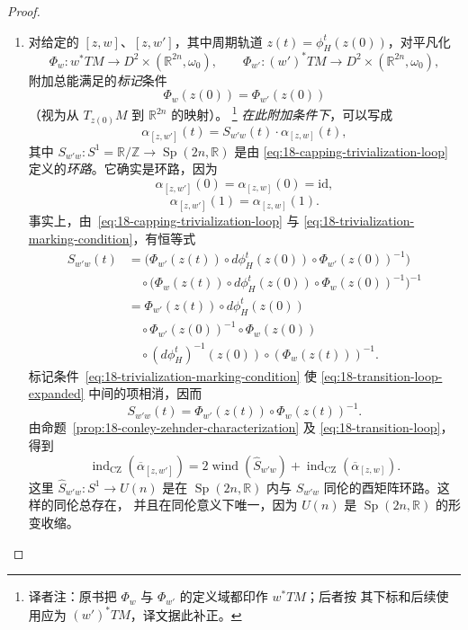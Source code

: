 \begin{proof}
\begin{enumerate}[label=\arabic*.]
\item {} 对给定的 $[z,w]$、$[z,w']$，其中周期轨道
$z(t)=\phi_H^t(z(0))$，对平凡化
\[
 \Phi_w:w^*TM\to D^2\times(\mathbb R^{2n},\omega_0),\qquad
 \Phi_{w'}:(w')^*TM\to D^2\times(\mathbb R^{2n},\omega_0),
\]
附加总能满足的\emph{标记}条件
\begin{equation}
 \Phi_w(z(0))=\Phi_{w'}(z(0))
 \label{eq:18-trivialization-marking-condition}
\end{equation}
（视为从 $T_{z(0)}M$ 到 $\mathbb R^{2n}$ 的映射）。
\footnote{译者注：原书把 $\Phi_w$ 与 $\Phi_{w'}$ 的定义域都印作 $w^*TM$；后者按
其下标和后续使用应为 $(w')^*TM$，译文据此补正。}
\emph{在此附加条件下}，可以写成
\begin{equation}
 \alpha_{[z,w']}(t)=S_{w'w}(t)\cdot\alpha_{[z,w]}(t),
 \label{eq:18-capping-trivialization-loop}
\end{equation}
其中 $S_{w'w}:S^1=\mathbb R/\mathbb Z\to\operatorname{Sp}(2n,\mathbb R)$ 是由
\eqref{eq:18-capping-trivialization-loop} 定义的\emph{环路}。它确实是环路，因为
\begin{equation}
 \alpha_{[z,w']}(0)=\alpha_{[z,w]}(0)=\mathrm{id},
 \label{eq:18-capping-path-start}
\end{equation}
\begin{equation}
 \alpha_{[z,w']}(1)=\alpha_{[z,w]}(1).
 \label{eq:18-capping-path-end}
\end{equation}
事实上，由~\eqref{eq:18-capping-trivialization-loop} 与
\eqref{eq:18-trivialization-marking-condition}，有恒等式
\begin{align}
 S_{w'w}(t)
 &=\bigl(\Phi_{w'}(z(t))\circ d\phi_H^t(z(0))
          \circ\Phi_{w'}(z(0))^{-1}\bigr)\nonumber\\
 &\quad\circ\bigl(\Phi_w(z(t))\circ d\phi_H^t(z(0))
          \circ\Phi_w(z(0))^{-1}\bigr)^{-1}\nonumber\\
 &=\Phi_{w'}(z(t))\circ d\phi_H^t(z(0))\nonumber\\
 &\quad\circ\Phi_{w'}(z(0))^{-1}\circ\Phi_w(z(0))\nonumber\\
 &\quad\circ(d\phi_H^t)^{-1}(z(0))\circ(\Phi_w(z(t)))^{-1}.
 \label{eq:18-transition-loop-expanded}
\end{align}
标记条件~\eqref{eq:18-trivialization-marking-condition} 使
\eqref{eq:18-transition-loop-expanded} 中间的项相消，因而
\begin{equation}
 S_{w'w}(t)=\Phi_{w'}(z(t))\circ\Phi_w(z(t))^{-1}.
 \label{eq:18-transition-loop}
\end{equation}
由命题~\ref{prop:18-conley-zehnder-characterization} 及
\eqref{eq:18-transition-loop}，得到
\begin{equation}
 \operatorname{ind}_{\mathrm{CZ}}(\overline\alpha_{[z,w']})
 =2\operatorname{wind}(\widehat S_{w'w})
  +\operatorname{ind}_{\mathrm{CZ}}(\overline\alpha_{[z,w]}).
 \label{eq:18-index-transition-winding}
\end{equation}
这里 $\widehat S_{w'w}:S^1\to U(n)$ 是在
$\operatorname{Sp}(2n,\mathbb R)$ 内与 $S_{w'w}$ 同伦的酉矩阵环路。这样的同伦总存在，
并且在同伦意义下唯一，因为 $U(n)$ 是 $\operatorname{Sp}(2n,\mathbb R)$ 的形变收缩。


\end{enumerate}
\end{proof}
